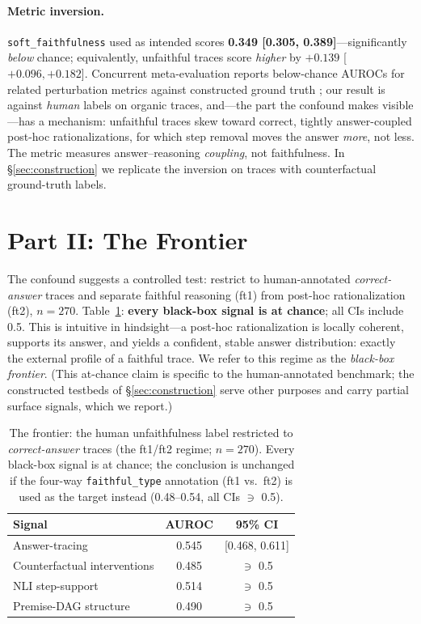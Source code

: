 \documentclass[11pt]{article}
\begin{document}
\paragraph{Metric inversion.} \texttt{soft\_faithfulness} used as intended scores \textbf{0.349 [0.305, 0.389]}---significantly \emph{below} chance; equivalently, unfaithful traces score \emph{higher} by $+0.139$ [$+0.096, +0.182$]. Concurrent meta-evaluation reports below-chance AUROCs for related perturbation metrics against constructed ground truth \citep{gurarieh2026bonafide}; our result is against \emph{human} labels on organic traces, and---the part the confound makes visible---has a mechanism: unfaithful traces skew toward correct, tightly answer-coupled post-hoc rationalizations, for which step removal moves the answer \emph{more}, not less. The metric measures answer--reasoning \emph{coupling}, not faithfulness. In \S\ref{sec:construction} we replicate the inversion on traces with counterfactual ground-truth labels.

\section{Part II: The Frontier}
\label{sec:frontier}

The confound suggests a controlled test: restrict to human-annotated \emph{correct-answer} traces and separate faithful reasoning (ft1) from post-hoc rationalization (ft2), $n{=}270$. Table~\ref{tab:frontier}: \textbf{every black-box signal is at chance}; all CIs include 0.5. This is intuitive in hindsight---a post-hoc rationalization is locally coherent, supports its answer, and yields a confident, stable answer distribution: exactly the external profile of a faithful trace. We refer to this regime as the \emph{black-box frontier}. (This at-chance claim is specific to the human-annotated benchmark; the constructed testbeds of \S\ref{sec:construction} serve other purposes and carry partial surface signals, which we report.)

\begin{table}[t]
\centering
\small
\begin{tabular}{@{}lcc@{}}
\toprule
\textbf{Signal} & \textbf{AUROC} & \textbf{95\% CI} \\
\midrule
Answer-tracing & 0.545 & [0.468, 0.611] \\
Counterfactual interventions & 0.485 & $\ni$ 0.5 \\
NLI step-support & 0.514 & $\ni$ 0.5 \\
Premise-DAG structure & 0.490 & $\ni$ 0.5 \\
\bottomrule
\end{tabular}
\caption{The frontier: the human unfaithfulness label restricted to \emph{correct-answer} traces (the ft1/ft2 regime; $n{=}270$). Every black-box signal is at chance; the conclusion is unchanged if the four-way \texttt{faithful\_type} annotation (ft1 vs.\ ft2) is used as the target instead (0.48--0.54, all CIs $\ni$ 0.5).}
\label{tab:frontier}
\end{table}
\end{document}
